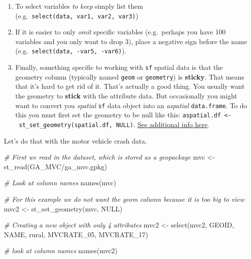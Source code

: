 \documentclass[
]{book}
\newenvironment{Shaded}{\begin{snugshade}}{\end{snugshade}}
\newcommand{\CommentTok}[1]{\textcolor[rgb]{0.56,0.35,0.01}{\textit{#1}}}
\newcommand{\ConstantTok}[1]{\textcolor[rgb]{0.00,0.00,0.00}{#1}}
\newcommand{\FunctionTok}[1]{\textcolor[rgb]{0.00,0.00,0.00}{#1}}
\newcommand{\NormalTok}[1]{#1}
\newcommand{\OtherTok}[1]{\textcolor[rgb]{0.56,0.35,0.01}{#1}}
\newcommand{\StringTok}[1]{\textcolor[rgb]{0.31,0.60,0.02}{#1}}
\providecommand{\tightlist}{%
  \setlength{\itemsep}{0pt}\setlength{\parskip}{0pt}}
\begin{document}
\begin{enumerate}
\def\labelenumi{\arabic{enumi}.}
\tightlist
\item
  To select variables \emph{to keep} simply list them (e.g.~\texttt{select(data,\ var1,\ var2,\ var3)})
\item
  If it is easier to only \emph{omit} specific variables (e.g.~perhaps you have 100 variables and you only want to drop 3), place a negative sign before the name (e.g.~\texttt{select(data,\ -var5,\ -var6)}).
\item
  Finally, something specific to working with \texttt{sf} spatial data is that the geometry column (typically named \texttt{geom} or \texttt{geometry}) is \textbf{sticky}. That means that it's hard to get rid of it. That's actually a good thing. You usually want the geometry to \textbf{stick} with the attribute data. But occasionally you might want to convert you \emph{spatial} \texttt{sf} data object into an \emph{aspatial} \texttt{data.frame}. To do this you must first set the geometry to be null like this: \texttt{aspatial.df\ \textless{}-\ st\_set\_geometry(spatial.df,\ NULL)}. \protect\hyperlink{sf-overview}{See additional info here}.
\end{enumerate}

Let's do that with the motor vehicle crash data.

\begin{Shaded}
\begin{Highlighting}[]
\CommentTok{\# First we read in the dataset, which is stored as a geopackage}
\NormalTok{mvc }\OtherTok{\textless{}{-}} \FunctionTok{st\_read}\NormalTok{(}\StringTok{\textquotesingle{}GA\_MVC/ga\_mvc.gpkg\textquotesingle{}}\NormalTok{)}

\CommentTok{\# Look at column names}
\FunctionTok{names}\NormalTok{(mvc)}

\CommentTok{\# For this example we do not want the geom column because it is too big to view}
\NormalTok{mvc2 }\OtherTok{\textless{}{-}} \FunctionTok{st\_set\_geometry}\NormalTok{(mvc, }\ConstantTok{NULL}\NormalTok{)}

\CommentTok{\# Creating a new object with only 4 attributes}
\NormalTok{mvc2 }\OtherTok{\textless{}{-}} \FunctionTok{select}\NormalTok{(mvc2, GEOID, NAME, rural, MVCRATE\_05, MVCRATE\_17)}

\CommentTok{\# look at column names}
\FunctionTok{names}\NormalTok{(mvc2)}
\end{Highlighting}
\end{Shaded}
\end{document}
